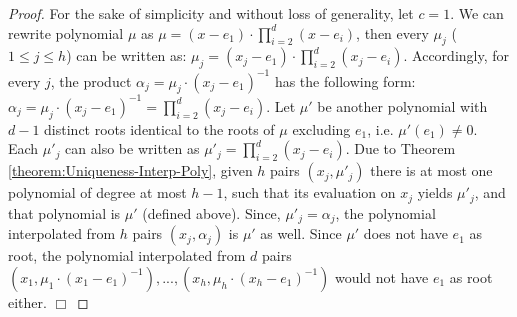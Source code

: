\begin{proof}
For the sake of simplicity and without loss of generality, let $c=1$. We can rewrite polynomial $\mu$ as $\mu=(x-e_{\scriptscriptstyle 1})\cdot\prod\limits^{\scriptscriptstyle d}_{\scriptscriptstyle i=2}(x-e_{\scriptscriptstyle i})$, then every $\mu_{\scriptscriptstyle j}$ ($1\leq j \leq h$) can be written as: $\mu_{\scriptscriptstyle j}=(x_{\scriptscriptstyle j}-e_{\scriptscriptstyle 1})\cdot\prod\limits^{\scriptscriptstyle d}_{\scriptscriptstyle i=2}(x_{\scriptscriptstyle j}-e_{\scriptscriptstyle i})$. Accordingly,  for every $j$, the product $\alpha_{\scriptscriptstyle j}=\mu_{\scriptscriptstyle j}\cdot (x_{\scriptscriptstyle j}-e_{\scriptscriptstyle 1})^{\scriptscriptstyle -1}$ has the following form: $\alpha_{\scriptscriptstyle j}=\mu_{\scriptscriptstyle j}\cdot (x_{\scriptscriptstyle j}-e_{\scriptscriptstyle 1})^{\scriptscriptstyle -1}=\prod\limits^{\scriptscriptstyle d}_{\scriptscriptstyle i=2}(x_{\scriptscriptstyle j}-e_{\scriptscriptstyle i})$. Let $\mu'$ be another polynomial with  $d-1$ distinct roots identical to the roots of $\mu$ excluding $e_{\scriptscriptstyle 1}$, i.e. $\mu'(e_{\scriptscriptstyle 1})\neq0$. Each $\mu'_{\scriptscriptstyle j}$ can also be written as $\mu'_{\scriptscriptstyle j}=\prod\limits^{\scriptscriptstyle d}_{\scriptscriptstyle i=2}(x_{\scriptscriptstyle j}-e_{\scriptscriptstyle i})$. Due to Theorem \ref{theorem:Uniqueness-Interp-Poly}, given $h$ pairs $(x_{\scriptscriptstyle j},\mu'_{\scriptscriptstyle j})$ there is at most one polynomial of degree at most $h-1$, such that its evaluation on  $x_{\scriptscriptstyle j}$ yields $\mu'_{\scriptscriptstyle j}$,  and that polynomial  is $\mu'$ (defined above). Since, $\mu'_{\scriptscriptstyle j}=\alpha_{\scriptscriptstyle j}$, the polynomial interpolated from $h$ pairs $(x_{\scriptscriptstyle j},\alpha_{\scriptscriptstyle j})$ is  $\mu'$ as well. Since $\mu'$ does not have $e_{\scriptscriptstyle 1}$ as  root, the polynomial interpolated from $d$ pairs $(x_{\scriptscriptstyle 1}, \mu_{\scriptscriptstyle 1}\cdot (x_{\scriptscriptstyle 1}-e_{\scriptscriptstyle 1})^{\scriptscriptstyle -1} ),..., (x_{\scriptscriptstyle h}, \mu_{\scriptscriptstyle h}\cdot (x_{\scriptscriptstyle h}-e_{\scriptscriptstyle 1})^{\scriptscriptstyle -1} )$ would not have $e_{\scriptscriptstyle 1}$ as  root either.   \hfill\(\Box\)
\end{proof}


